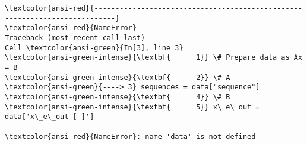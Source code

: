 \documentclass[11pt]{article}
\begin{document}
    \begin{Verbatim}[commandchars=\\\{\}, frame=single, framerule=2mm, rulecolor=\color{outerrorbackground}]
\textcolor{ansi-red}{---------------------------------------------------------------------------}
\textcolor{ansi-red}{NameError}                                 Traceback (most recent call last)
Cell \textcolor{ansi-green}{In[3], line 3}
\textcolor{ansi-green-intense}{\textbf{      1}} \# Prepare data as Ax = B
\textcolor{ansi-green-intense}{\textbf{      2}} \# A
\textcolor{ansi-green}{----> 3} sequences = data["sequence"]
\textcolor{ansi-green-intense}{\textbf{      4}} \# B
\textcolor{ansi-green-intense}{\textbf{      5}} x\_e\_out = data['x\_e\_out [-]']

\textcolor{ansi-red}{NameError}: name 'data' is not defined
    \end{Verbatim}
\end{document}
